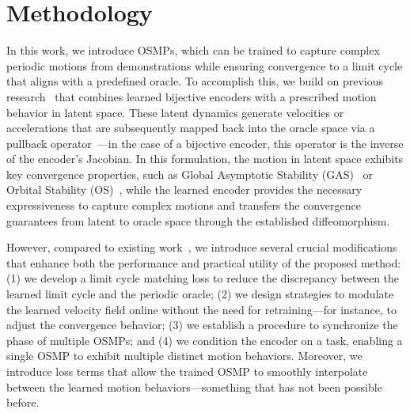 \section{Methodology}

In this work, we introduce \glspl{OSMP}, which can be trained to capture complex periodic motions from demonstrations while ensuring convergence to a limit cycle that aligns with a predefined oracle. To accomplish this, we build on previous research~\citep{rana2020euclideanizing, zhi2024teaching} that combines learned bijective encoders with a prescribed motion behavior in latent space. These latent dynamics generate velocities or accelerations that are subsequently mapped back into the oracle space via a pullback operator~\citep{zhang2022learning}—in the case of a bijective encoder, this operator is the inverse of the encoder’s Jacobian. In this formulation, the motion in latent space exhibits key convergence properties, such as Global Asymptotic Stability (GAS)~\citep{rana2020euclideanizing, perez2023stable, sochopoulos2024learning} or Orbital Stability (OS)~\citep{zhi2024teaching}, while the learned encoder provides the necessary expressiveness to capture complex motions and transfers the convergence guarantees from latent to oracle space through the established diffeomorphism.

However, compared to existing work~\citep{zhi2024teaching}, we introduce several crucial modifications that enhance both the performance and practical utility of the proposed method: (1) we develop a limit cycle matching loss to reduce the discrepancy between the learned limit cycle and the periodic oracle; (2) we design strategies to modulate the learned velocity field online without the need for retraining—for instance, to adjust the convergence behavior; (3) we establish a procedure to synchronize the phase of multiple \glspl{OSMP}; and (4) we condition the encoder on a task, enabling a single \gls{OSMP} to exhibit multiple distinct motion behaviors. Moreover, we introduce loss terms that allow the trained \gls{OSMP} to smoothly interpolate between the learned motion behaviors—something that has not been possible before.

